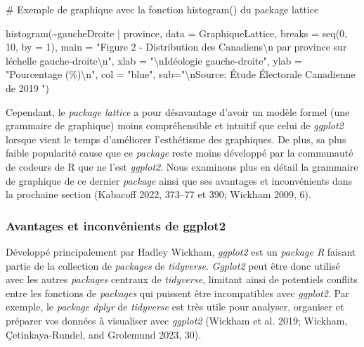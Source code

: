 \documentclass[
  letterpaper,
]{scrbook}
\newenvironment{Shaded}{\begin{snugshade}}{\end{snugshade}}
\newcommand{\AttributeTok}[1]{\textcolor[rgb]{0.40,0.45,0.13}{#1}}
\newcommand{\CommentTok}[1]{\textcolor[rgb]{0.37,0.37,0.37}{#1}}
\newcommand{\DecValTok}[1]{\textcolor[rgb]{0.68,0.00,0.00}{#1}}
\newcommand{\FunctionTok}[1]{\textcolor[rgb]{0.28,0.35,0.67}{#1}}
\newcommand{\NormalTok}[1]{\textcolor[rgb]{0.00,0.23,0.31}{#1}}
\newcommand{\SpecialCharTok}[1]{\textcolor[rgb]{0.37,0.37,0.37}{#1}}
\newcommand{\StringTok}[1]{\textcolor[rgb]{0.13,0.47,0.30}{#1}}
\begin{document}
\begin{Shaded}
\begin{Highlighting}[]
\CommentTok{\# Exemple de graphique avec la fonction histogram() du package lattice}

\FunctionTok{histogram}\NormalTok{(}\SpecialCharTok{\textasciitilde{}}\NormalTok{gaucheDroite }\SpecialCharTok{|}\NormalTok{ province, }\AttributeTok{data =}\NormalTok{ GraphiqueLattice, }\AttributeTok{breaks =} \FunctionTok{seq}\NormalTok{(}\DecValTok{0}\NormalTok{, }\DecValTok{10}\NormalTok{, }
  \AttributeTok{by =} \DecValTok{1}\NormalTok{), }
  \AttributeTok{main =} \StringTok{"Figure 2 {-} Distribution des Canadiens}\SpecialCharTok{\textbackslash{}n}\StringTok{ par province sur l\textquotesingle{}échelle gauche{-}droite}\SpecialCharTok{\textbackslash{}n}\StringTok{"}\NormalTok{,}
  \AttributeTok{xlab =} \StringTok{"}\SpecialCharTok{\textbackslash{}n}\StringTok{Idéologie gauche{-}droite"}\NormalTok{,}
  \AttributeTok{ylab =} \StringTok{"Pourcentage (\%)}\SpecialCharTok{\textbackslash{}n}\StringTok{"}\NormalTok{,}
  \AttributeTok{col  =} \StringTok{"blue"}\NormalTok{,}
  \AttributeTok{sub=}\StringTok{"}\SpecialCharTok{\textbackslash{}n}\StringTok{Source: Étude Électorale Canadienne de 2019                                                "}\NormalTok{)}
\end{Highlighting}
\end{Shaded}

Cependant, le \emph{package lattice} a pour désavantage d'avoir un
modèle formel (une grammaire de graphique) moins compréhensible et
intuitif que celui de \emph{ggplot2} lorsque vient le temps d'améliorer
l'esthétisme des graphiques. De plus, sa plus faible popularité cause
que ce \emph{package} reste moins développé par la communauté de codeurs
de R que ne l'est \emph{ggplot2}. Nous examinons plus en détail la
grammaire de graphique de ce dernier \emph{package} ainsi que ses
avantages et inconvénients dans la prochaine section (Kabacoff 2022,
373--77 et 390; Wickham 2009, 6).

\hypertarget{avantages-et-inconvuxe9nients-de-ggplot2}{%
\subsubsection{Avantages et inconvénients de
ggplot2}\label{avantages-et-inconvuxe9nients-de-ggplot2}}

Développé principalement par Hadley Wickham, \emph{ggplot2} est un
\emph{package R} faisant partie de la collection de \emph{packages} de
\emph{tidyverse}. \emph{Ggplot2} peut être donc utilisé avec les autres
\emph{packages} centraux de \emph{tidyverse}, limitant ainsi de
potentiels conflits entre les fonctions de \emph{packages} qui puissent
être incompatibles avec \emph{ggplot2}. Par exemple, le \emph{package
dplyr} de \emph{tidyverse} est très utile pour analyser, organiser et
préparer vos données à visualiser avec \emph{ggplot2} (Wickham et al.
2019; Wickham, Çetinkaya-Rundel, and Grolemund 2023, 30).
\end{document}
